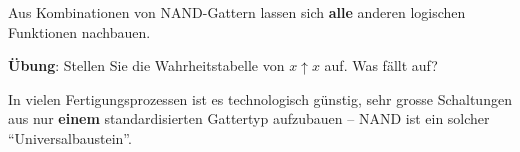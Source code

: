 \begin{frame}
\begin{center}
Aus Kombinationen von NAND-Gattern lassen sich \textbf{alle} anderen logischen Funktionen nachbauen.
\vspace{4mm}

\textbf{Übung}: Stellen Sie die Wahrheitstabelle von $x \uparrow x$ auf. Was fällt auf?
\end{center}
\end{frame}

\begin{frame}
\begin{center}
In vielen Fertigungsprozessen ist es technologisch günstig, sehr grosse Schaltungen aus nur \textbf{einem} standardisierten Gattertyp aufzubauen -- NAND ist ein solcher \enquote{Universalbaustein}.
\end{center}
\end{frame}

{
\begin{frame}
\end{frame}}

